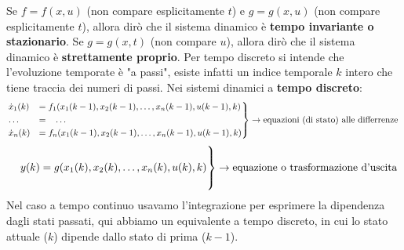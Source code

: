 \newline
Se $f = f(x,u)$ (non compare esplicitamente $t$) e $g = g(x,u)$ (non compare esplicitamente $t$), allora dirò che il sistema dinamico è \textbf{tempo invariante o stazionario}.\newline
\newline
Se $g = g(x,t)$ (non compare $u$), allora dirò che il sistema dinamico è \textbf{strettamente proprio}.\newline
\newline
Per tempo discreto si intende che l'evoluzione temporate è "a passi", esiste infatti un indice temporale $k$ intero che tiene traccia dei numeri di passi.\newline
Nei sistemi dinamici a \textbf{tempo discreto}: 
\[
    \begin{rcases}
        \dot{x}_1(k) &= f_1(x_1(k-1),x_2(k-1), \dots, x_n(k-1), u(k-1), k)\\
        \dots \;\;\;&= \;\;\;\dots\\
        \dot{x}_n(k) &= f_n(x_1(k-1),x_2(k-1), \dots, x_n(k-1), u(k-1), k)
    \end{rcases} \rightarrow \text{equazioni (di stato) alle differrenze}\;
\]
\[
    \begin{rcases}
        \\
        \;\;\;\; y(k) = g(x_1(k),x_2(k), \dots, x_n(k), u(k), k)\\
        \\
    \end{rcases} \rightarrow \text{equazione o trasformazione d'uscita}\;
\]
Nel caso a tempo continuo usavamo l'integrazione per esprimere la dipendenza dagli stati passati, qui abbiamo un equivalente a tempo discreto, in cui lo stato attuale ($k$) dipende dallo stato di prima ($k-1$).
